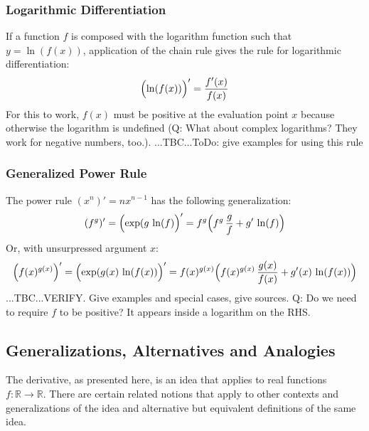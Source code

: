 \subsubsection{Logarithmic Differentiation} 
If a function $f$ is composed with the logarithm function such that $y = \ln(f(x))$, application of the chain rule gives the rule for logarithmic differentiation:
\begin{equation}
 \Bigl( \ln(f(x)) \Bigr)' = \frac{f'(x)}{f(x)}
\end{equation}
For this to work, $f(x)$ must be positive at the evaluation point $x$ because otherwise the logarithm is undefined (Q: What about complex logarithms? They work for negative numbers, too.). ...TBC...ToDo: give examples for using this rule




\subsubsection{Generalized Power Rule} 
The power rule $(x^n)' = n x^{n-1}$ has the following generalization:
\begin{equation}
 (f^g)' = \Bigl( \exp(g \, \ln(f) \Bigr) '
        = f^g \Bigl(f^g \, \frac{g}{f} + g' \, \ln(f) \Bigr)
\end{equation}
Or, with unsurpressed argument $x$:
\begin{equation}
 \Bigl(f(x)^{g(x)}\Bigr)' 
 = \Bigl( \exp(g(x) \, \ln(f(x)) \Bigr) '
 = f(x)^{g(x)} \Bigl(f(x)^{g(x)} \, \frac{g(x)}{f(x)} + g'(x) \, \ln(f(x)) \Bigr)
\end{equation}
...TBC...VERIFY. Give examples and special cases, give sources. Q: Do we need to require $f$ to be positive? It appears inside a logarithm on the RHS.




\subsection{Generalizations, Alternatives and Analogies}
The derivative, as presented here, is an idea that applies to real functions $f: \mathbb{R} \rightarrow \mathbb{R}$. There are certain related notions that apply to other contexts and generalizations of the idea and alternative but equivalent definitions of the same idea.

